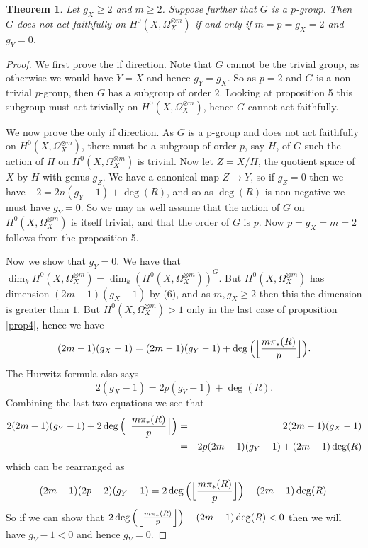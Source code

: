 \documentclass[11pt]{article} %
\newtheorem{thm}{Theorem}
\begin{document}
\begin{thm}
	Let $g_X\geq 2$ and $m\geq 2$. Suppose further that $G$ is a $p$-group. Then $G$ does not act 
faithfully on $H^0(X,\Omega_X^{\otimes m})$ if and only if $m=p=g_X=2$ and $g_Y=0$.
\end{thm}
\begin{proof}
	We first prove the if direction. Note that $G$ cannot be the trivial group, as otherwise we would have $Y=X$ and 
	hence $g_Y=g_X$. So as $p=2$ and $G$ is a non-trivial $p$-group, then $G$ has a subgroup of order $2$. Looking at 
	proposition 5 this subgroup must act trivially on $H^0(X,\Omega_X^{\otimes m})$, hence $G$ cannot act faithfully.
	
	We now prove the only if direction. As $G$ is a p-group and does not act faithfully on $H^0(X,\Omega_X^{\otimes m})$, 
	there must be a subgroup of order $p$, say $H$, of $G$ such the action of $H$ on $H^0(X,\Omega_X^{\otimes m})$ is 
	trivial. Now let $Z=X/H$, the quotient space of $X$ by $H$ with genus $g_Z$. We have a canonical map $Z\rightarrow Y$, 
	so if $g_Z=0$ then we have $-2=2n(g_Y-1)+\deg(R)$, and so as $\deg(R)$ is non-negative we must have $g_Y=0$. 
	So we may as well assume that the action of $G$ on $H^0(X,\Omega_X^{\otimes m})$ is itself trivial, and that 
	the order of $G$ is $p$. Now $p=g_X=m=2$ follows from the proposition 5.
	
	Now we show that $g_Y=0$. We have that $\dim_kH^0(X,\Omega_X^{\otimes m})=\dim_k(H^0(X,\Omega_X^{\otimes m}))^G$. 
	But $H^0(X,\Omega_X^{\otimes m})$ has dimension $(2m-1)(g_X-1)$ by (6), and as $m,g_X\geq 2$ then this the 
	dimension is greater than $1$. But $H^0(X,\Omega_X^{\otimes m})>1$ only in the last case of proposition 
	\ref{prop4}, hence we have
		\begin{equation*}
			(2m-1)(g_X-1)=(2m-1)(g_Y-1)+\deg\Big(\Big{\lfloor}\frac{m\pi_*(R)}{p}\Big{\rfloor}\Big).
		\end{equation*}
	The Hurwitz formula also says
		\begin{equation*}
			2(g_X-1)=2p(g_Y-1)+\deg(R).
		\end{equation*}
	Combining the last two equations we see that
		\begin{eqnarray*}
			2(2m-1)(g_Y-1)+2\deg\Big(\Big{\lfloor}\frac{m\pi_*(R)}{p}\Big{\rfloor}\Big) & = & 2(2m-1)(g_X-1)\\
			& = & 2p(2m-1)(g_Y-1)+(2m-1)\deg(R)
		\end{eqnarray*}
	which can be rearranged as
		\begin{equation*}
			(2m-1)(2p-2)(g_Y-1)=2\deg\Big(\Big{\lfloor}\frac{m\pi_*(R)}{p}\Big{\rfloor}\Big)-(2m-1)\deg(R).
		\end{equation*}
	So if we can show that $2\deg\Big(\Big{\lfloor}\frac{m\pi_*(R)}{p}\Big{\rfloor}\Big)-(2m-1)\deg(R)<0$ 
	then we will have $g_Y-1<0$ and hence $g_Y=0$.


\end{proof}
\end{document}

